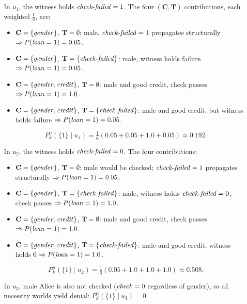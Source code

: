 In $u_1$, the witness holds $\varname{check\text{-}failed}=1$.
The four $(\mathbf{C},\mathbf{T})$ contributions, each weighted $\tfrac{1}{6}$, are:
\begin{itemize}
\item[$\circ$] $\mathbf{C}=\{\varname{gender}\}$, $\mathbf{T}=\emptyset$:
  male, $\varname{check\text{-}failed}=1$ propagates structurally
  $\Rightarrow P(\varname{loan}=1)=0.05$.
\item[$\circ$] $\mathbf{C}=\{\varname{gender}\}$,
  $\mathbf{T}=\{\varname{check\text{-}failed}\}$:
  male, witness holds failure
  $\Rightarrow P(\varname{loan}=1)=0.05$.
\item[$\circ$] $\mathbf{C}=\{\varname{gender},\varname{credit}\}$, $\mathbf{T}=\emptyset$:
  male and good credit, check passes
  $\Rightarrow P(\varname{loan}=1)=1.0$.
\item[$\circ$] $\mathbf{C}=\{\varname{gender},\varname{credit}\}$,
  $\mathbf{T}=\{\varname{check\text{-}failed}\}$:
  male and good credit, but witness holds failure
  $\Rightarrow P(\varname{loan}=1)=0.05$.
\end{itemize}
\[ P_k^n(\{1\}\mid u_1)
   = \tfrac{1}{6}(0.05+0.05+1.0+0.05) \approx 0.192. \]

In $u_2$, the witness holds $\varname{check\text{-}failed}=0$.
The four contributions:
\begin{itemize}
\item[$\circ$] $\mathbf{C}=\{\varname{gender}\}$, $\mathbf{T}=\emptyset$:
  male would be checked; $\varname{check\text{-}failed}=1$ propagates structurally
  $\Rightarrow P(\varname{loan}=1)=0.05$.
\item[$\circ$] $\mathbf{C}=\{\varname{gender}\}$,
  $\mathbf{T}=\{\varname{check\text{-}failed}\}$:
  male, witness holds $\varname{check\text{-}failed}=0$, check passes
  $\Rightarrow P(\varname{loan}=1)=1.0$.
\item[$\circ$] $\mathbf{C}=\{\varname{gender},\varname{credit}\}$, $\mathbf{T}=\emptyset$:
  male and good credit, check passes
  $\Rightarrow P(\varname{loan}=1)=1.0$.
\item[$\circ$] $\mathbf{C}=\{\varname{gender},\varname{credit}\}$,
  $\mathbf{T}=\{\varname{check\text{-}failed}\}$:
  male and good credit, witness holds $0$
  $\Rightarrow P(\varname{loan}=1)=1.0$.
\end{itemize}
\[ P_k^n(\{1\}\mid u_2)
   = \tfrac{1}{6}(0.05+1.0+1.0+1.0) \approx 0.508. \]

In $u_3$, male Alice is also not checked ($\varname{check}=0$ regardless of gender),
so all necessity worlds yield denial: $P_k^n(\{1\}\mid u_3)=0$.


